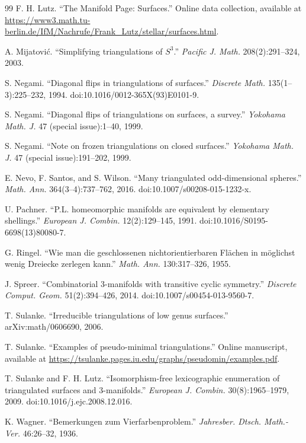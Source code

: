 \documentclass[11pt]{article}
\theoremstyle{remark}
\theoremstyle{plain}
\begin{document}
\begin{thebibliography}{99}
F. H. Lutz.
``The Manifold Page: Surfaces.''
Online data collection, available at
\url{https://www3.math.tu-berlin.de/IfM/Nachrufe/Frank_Lutz/stellar/surfaces.html}.

A. Mijatovi\'c.
``Simplifying triangulations of \(S^3\).''
\emph{Pacific J. Math.} 208(2):291--324, 2003.

S. Negami.
``Diagonal flips in triangulations of surfaces.''
\emph{Discrete Math.} 135(1--3):225--232, 1994.
doi:10.1016/0012-365X(93)E0101-9.

S. Negami.
``Diagonal flips of triangulations on surfaces, a survey.''
\emph{Yokohama Math. J.} 47 (special issue):1--40, 1999.

S. Negami.
``Note on frozen triangulations on closed surfaces.''
\emph{Yokohama Math. J.} 47 (special issue):191--202, 1999.

E. Nevo, F. Santos, and S. Wilson.
``Many triangulated odd-dimensional spheres.''
\emph{Math. Ann.} 364(3--4):737--762, 2016.
doi:10.1007/s00208-015-1232-x.

U. Pachner.
``P.L. homeomorphic manifolds are equivalent by elementary shellings.''
\emph{European J. Combin.} 12(2):129--145, 1991.
doi:10.1016/S0195-6698(13)80080-7.

G. Ringel.
``Wie man die geschlossenen nichtorientierbaren Fl\"achen in m\"oglichst
wenig Dreiecke zerlegen kann.''
\emph{Math. Ann.} 130:317--326, 1955.

J. Spreer.
``Combinatorial 3-manifolds with transitive cyclic symmetry.''
\emph{Discrete Comput. Geom.} 51(2):394--426, 2014.
doi:10.1007/s00454-013-9560-7.

T. Sulanke.
``Irreducible triangulations of low genus surfaces.''
arXiv:math/0606690, 2006.

T. Sulanke.
``Examples of pseudo-minimal triangulations.''
Online manuscript, available at
\url{https://tsulanke.pages.iu.edu/graphs/pseudomin/examples.pdf}.

T. Sulanke and F. H. Lutz.
``Isomorphism-free lexicographic enumeration of triangulated surfaces and
3-manifolds.''
\emph{European J. Combin.} 30(8):1965--1979, 2009.
doi:10.1016/j.ejc.2008.12.016.

K. Wagner.
``Bemerkungen zum Vierfarbenproblem.''
\emph{Jahresber. Dtsch. Math.-Ver.} 46:26--32, 1936.

\end{thebibliography}
\end{document}
